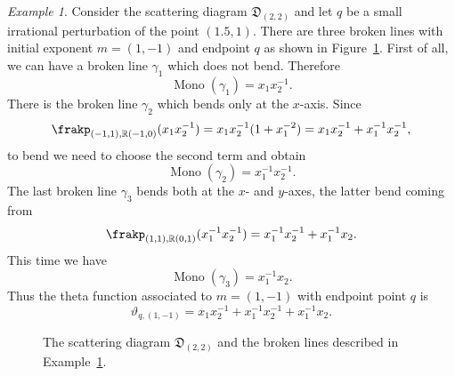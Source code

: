 \documentclass[11pt]{amsart}
\theoremstyle{remark}
\newtheorem{example}[theorem]{Example}
\numberwithin{equation}{section}
\newcommand{\RR}{\mathbb{R}}
\newcommand{\fD}{\mathfrak{D}}
\newcommand{\Mono}{\operatorname{Mono}}
\begin{document}
\begin{example} 
  \label{brokenex}
  Consider the scattering diagram $\fD_{(2,2)}$ and let $q$ be a small
  irrational perturbation of the point $(1.5,1)$. There are three broken lines
  with initial exponent $m = (1,-1)$ and endpoint $q$ as shown in
  Figure~\ref{figbrokenex}.
  First of all, we can have a broken line $\gamma_1$ which does not bend.
  Therefore
  \[
    \Mono(\gamma_1) = x_1 x_2^{-1}.
  \]
  There is the broken line $\gamma_2$  which bends only at the $x$-axis. Since
  \[ 
    \frakp_{(-1,1), \RR(-1,0)} (x_1 x_2^{-1}) = 
    x_1 x_2^{-1}(1+x_1^{-2}) =  x_1 x_2^{-1} + x_1^{-1} x_2^{-1},
  \]
  to bend we need to choose the second term and obtain 
  \[
    \Mono(\gamma_2) =  x_1^{-1} x_2^{-1}.
  \]
  The last broken line $\gamma_3$ bends both at the $x$- and $y$-axes, the
  latter bend coming from
  \[ 
    \frakp_{ (1,1), \RR (0,1)} ( x_1^{-1} x_2^{-1}) =  
    x_1^{-1} x_2^{-1} + x_1^{-1} x_2.  
  \]
  This time we have 
  \[
    \Mono (\gamma_3) = x_1^{-1} x_2.
  \]
  Thus the theta function associated to $m = (1,-1)$ with endpoint point $q$ is 
  \[ 
    \vartheta_{q, (1,-1)} =  
    x_1 x_2^{-1} + x_1^{-1} x_2^{-1} +x_1^{-1} x_2 .  
  \]
\end{example}

\begin{figure}
  \centering
  \caption{The scattering diagram $\fD_{(2,2)}$ and the broken lines described in Example~\ref{brokenex}.} 
  \label{figbrokenex}
\end{figure}
\end{document}
